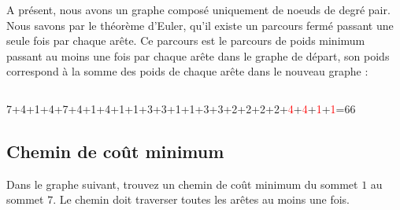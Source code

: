 \begin{solution}
A présent, nous avons un graphe composé uniquement de noeuds de degré
pair. Nous savons par le théorème d'Euler, qu'il existe un parcours
fermé passant une seule fois par chaque arête. Ce parcours est le
parcours de poids minimum passant au moins une fois par chaque arête
dans le graphe de départ, son poids correspond à la somme des poids
de chaque arête dans le nouveau graphe :

$\,$

\begin{center}
7+4+1+4+7+4+1+4+1+1+3+3+1+1+3+3+2+2+2+2+\textcolor{red}{4}+\textcolor{red}{4}+\textcolor{red}{1}+\textcolor{red}{1}=66
\par\end{center}
\end{solution}

\subsection{Chemin de coût minimum} Dans le graphe suivant, trouvez un chemin de coût minimum du sommet $1$ au sommet $7$. Le chemin doit traverser toutes les arêtes au moins une fois.

